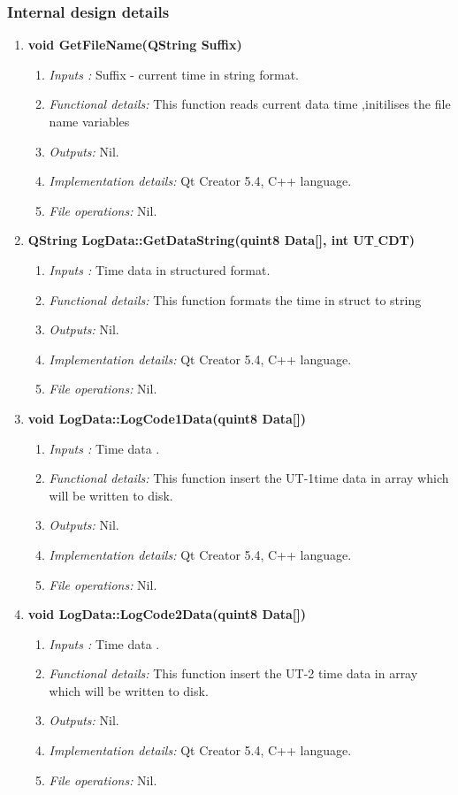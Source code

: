 \begin{enumerate}
\subsubsection{Internal design details }
\begin{enumerate}
	\item  \textbf{void GetFileName(QString Suffix)}
	\begin{enumerate}
		\item \textit{Inputs :} Suffix - current time in string format.
		\item \textit{Functional details:} This function reads current data time ,initilises the file name variables 
		\item \textit{Outputs:} Nil.
		\item \textit{Implementation details:} Qt Creator 5.4, C++ language.
		\item \textit{File operations:} Nil.
	\end{enumerate}
	
	\item  \textbf{QString LogData::GetDataString(quint8 Data[], int UT$\_$CDT)}
	\begin{enumerate}
		\item \textit{Inputs :} Time data in structured format.
		\item \textit{Functional details:} This function formats the time in struct to string  
		\item \textit{Outputs:} Nil.
		\item \textit{Implementation details:} Qt Creator 5.4, C++ language.
		\item \textit{File operations:} Nil.
	\end{enumerate}
	

	
	\item  \textbf{void LogData::LogCode1Data(quint8 Data[])}
	\begin{enumerate}
		\item \textit{Inputs :} Time data .
		\item \textit{Functional details:} This function insert the UT-1time data in array which will be written to disk.
		\item \textit{Outputs:} Nil.
		\item \textit{Implementation details:} Qt Creator 5.4, C++ language.
		\item \textit{File operations:} Nil.
	\end{enumerate}
	
	\item  \textbf{void LogData::LogCode2Data(quint8 Data[])}
	\begin{enumerate}
		\item \textit{Inputs :} Time data .
		\item \textit{Functional details:} This function insert the UT-2 time data in array which will be written to disk.
		\item \textit{Outputs:} Nil.
		\item \textit{Implementation details:} Qt Creator 5.4, C++ language.
		\item \textit{File operations:} Nil.
	\end{enumerate}
	

\end{enumerate}
\end{enumerate}
